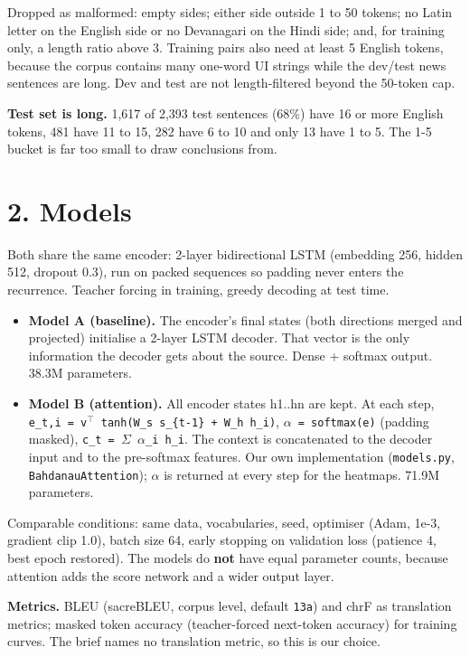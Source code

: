 \documentclass[10pt,a4paper]{article}
\providecommand{\tightlist}{\setlength{\itemsep}{0pt}\setlength{\parskip}{0pt}}
\begin{document}
Dropped as malformed: empty sides; either side outside 1 to 50 tokens; no Latin letter on the English side or no Devanagari on the Hindi side; and, for training only, a length ratio above 3. Training pairs also need at least 5 English tokens, because the corpus contains many one-word UI strings while the dev/test news sentences are long. Dev and test are not length-filtered beyond the 50-token cap.

\textbf{Test set is long.} 1,617 of 2,393 test sentences (68\%) have 16 or more English tokens, 481 have 11 to 15, 282 have 6 to 10 and only 13 have 1 to 5. The 1-5 bucket is far too small to draw conclusions from.

\hypertarget{models}{%
\section{2. Models}\label{models}}

Both share the same encoder: 2-layer bidirectional LSTM (embedding 256, hidden 512, dropout 0.3), run on packed sequences so padding never enters the recurrence. Teacher forcing in training, greedy decoding at test time.

\begin{itemize}
\tightlist
\item
  \textbf{Model A (baseline).} The encoder's final states (both directions merged and projected) initialise a 2-layer LSTM decoder. That vector is the only information the decoder gets about the source. Dense + softmax output. 38.3M parameters.
\item
  \textbf{Model B (attention).} All encoder states h1..hn are kept. At each step, \texttt{e\_t,i\ =\ v\ensuremath{^{\top}}\ tanh(W\_s\ s\_\{t-1\}\ +\ W\_h\ h\_i)}, \texttt{\ensuremath{\alpha}\ =\ softmax(e)} (padding masked), \texttt{c\_t\ =\ \ensuremath{\Sigma}\ \ensuremath{\alpha}\_i\ h\_i}. The context is concatenated to the decoder input and to the pre-softmax features. Our own implementation (\texttt{models.py}, \texttt{BahdanauAttention}); \ensuremath{\alpha} is returned at every step for the heatmaps. 71.9M parameters.
\end{itemize}

Comparable conditions: same data, vocabularies, seed, optimiser (Adam, 1e-3, gradient clip 1.0), batch size 64, early stopping on validation loss (patience 4, best epoch restored). The models do \textbf{not} have equal parameter counts, because attention adds the score network and a wider output layer.

\textbf{Metrics.} BLEU (sacreBLEU, corpus level, default \texttt{13a}) and chrF as translation metrics; masked token accuracy (teacher-forced next-token accuracy) for training curves. The brief names no translation metric, so this is our choice.
\end{document}
